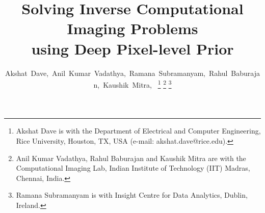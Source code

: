 \documentclass[journal,twoside]{IEEEtran}
\begin{document}
\title{Solving Inverse Computational Imaging Problems \\ using Deep Pixel-level Prior}

\author{Akshat~Dave,~Anil~Kumar~Vadathya,~Ramana~Subramanyam,~Rahul~Baburajan,~Kaushik~Mitra,~ %
\thanks{Akshat Dave is with the Department of Electrical and Computer Engineering, Rice University, Houston, TX, USA (e-mail: akshat.dave@rice.edu).}%
\thanks{Anil Kumar Vadathya, Rahul Baburajan and Kaushik Mitra are with the Computational Imaging Lab, Indian Institute of Technology (IIT) Madras, Chennai, India.}%
\thanks{Ramana Subramanyam is with Insight Centre for Data Analytics, Dublin, Ireland.}}















\maketitle
\end{document}
